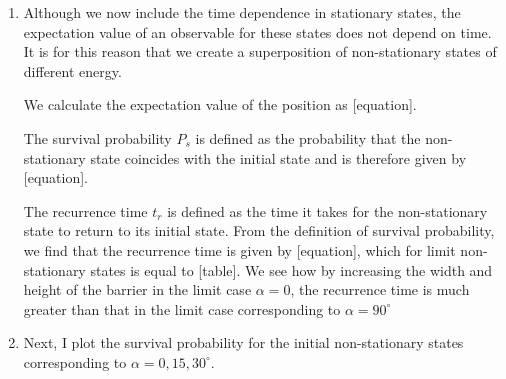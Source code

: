 \documentclass[12pt, a4paper]{article}
\begin{document}
\begin{enumerate}[label=\textbf{Slide \arabic*.}]
    \item Although we now include the time dependence in stationary states, the expectation value of an observable for these states does not depend on time. It is for this reason that we create a superposition of non-stationary states of different energy.

        We calculate the expectation value of the position as [equation].

        The survival probability $P_s$ is defined as the probability that the non-stationary state coincides with the initial state and is therefore given by [equation].

        The recurrence time $t_r$ is defined as the time it takes for the non-stationary state to return to its initial state. From the definition of survival probability, we find that the recurrence time is given by [equation], which for limit non-stationary states is equal to [table]. We see how by increasing the width and height of the barrier in the limit case $\alpha=0$, the recurrence time is much greater than that in the limit case corresponding to $\alpha=90^{\circ}$

    \item Next, I plot the survival probability for the initial non-stationary states corresponding to $\alpha=0,15,30^{\circ}$.


\end{enumerate}
\end{document}
